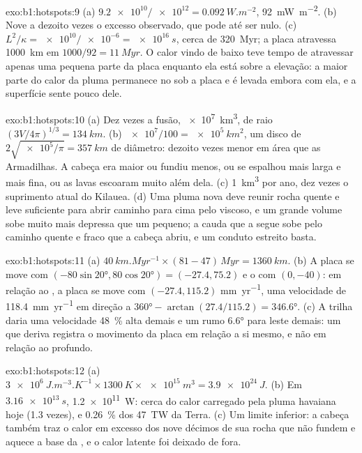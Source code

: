 \begin{solution}{exo:b1:hotspots:9}
(a) $\num{9.2e10}/\num{e12} = \qty{0.092}{W.m^{-2}}$, \qty{92}{mW.m^{-2}}. (b) Nove a dezoito vezes o excesso observado, que pode até ser nulo. (c) $L^2/\kappa =
\num{e10}/\num{e-6} = \qty{e16}{s}$, cerca de \qty{320}{Myr}; a placa atravessa \qty{1000}{km} em $1000/92 = \qty{11}{Myr}$. O calor vindo de baixo teve tempo de atravessar apenas uma pequena parte da placa enquanto ela está sobre a elevação: a maior parte do calor da pluma permanece no  sob a placa e é levada embora com ela, e a superfície sente pouco dele.
\end{solution}

\begin{solution}{exo:b1:hotspots:10}
(a) Dez vezes a fusão, \qty{e7}{km^3}, de raio
$(3V/4\pi)^{1/3} = \qty{134}{km}$. (b) $\num{e7}/100 = \qty{e5}{km^2}$, um disco de $2\sqrt{\num{e5}/\pi} = \qty{357}{km}$ de diâmetro: dezoito vezes menor em área que as Armadilhas. A cabeça era maior ou fundiu menos, ou se espalhou mais larga e mais fina, ou as lavas escoaram muito além dela. (c) \qty{1}{km^3} por ano, dez vezes o suprimento atual do Kilauea. (d) Uma pluma nova deve reunir rocha quente e leve suficiente para abrir caminho para cima pelo  viscoso, e um grande volume sobe muito mais depressa que um pequeno; a cauda que a segue sobe pelo caminho quente e fraco que a cabeça abriu, e um conduto estreito basta.
\end{solution}

\begin{solution}{exo:b1:hotspots:11}
(a) $\qty{40}{km.Myr^{-1}}\times(81 - 47)\,\unit{Myr} = \qty{1360}{km}$. (b) A placa se move com $(-80\sin\ang{20}, 80\cos\ang{20}) = (-27.4, 75.2)$ e o  com $(0, -40)$: em relação ao , a placa se move com $(-27.4, 115.2)$ \unit{mm.yr^{-1}}, uma velocidade de \qty{118.4}{mm.yr^{-1}} em direção a $\ang{360} - \arctan(27.4/115.2) = \ang{346.6}$. (c) A trilha daria uma velocidade \qty{48}{\percent} alta demais e um rumo \ang{6.6} para leste demais: um  que deriva registra o movimento da placa em relação a si mesmo, e não em relação ao  profundo.
\end{solution}

\begin{solution}{exo:b1:hotspots:12}
(a) $\qty{3e6}{J.m^{-3}.K^{-1}}\times\qty{1300}{K}\times\qty{e15}{m^3} =
\qty{3.9e24}{J}$. (b) Em $\qty{3.16e13}{s}$, \qty{1.2e11}{W}: cerca do calor carregado pela pluma havaiana hoje (1.3 vezes), e \qty{0.26}{\percent} dos \qty{47}{TW} da Terra. (c) Um limite inferior: a cabeça também traz o calor em excesso dos nove décimos de sua rocha que não fundem e aquece a base da , e o calor latente foi deixado de fora.
\end{solution}


